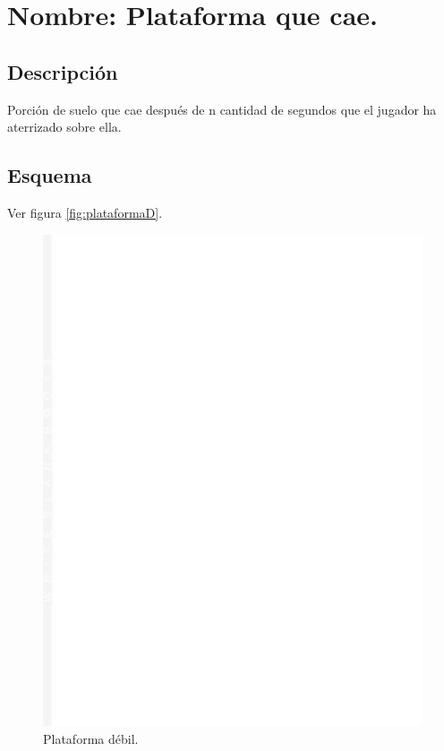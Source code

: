 \section{Nombre: Plataforma que cae.}\label{obs.plataformaD}
	\subsection{Descripción}
	Porción de suelo que cae después de n cantidad de segundos que el jugador ha aterrizado sobre ella.
	\subsection{Esquema}
	Ver figura \ref{fig:plataformaD}.
	\begin{figure}
		\centering
		\includegraphics[height=0.2 \textheight]{Imagenes/plataformaD}
		\caption{Plataforma débil.}
		\label{fig:plafarmaD}
	\end{figure}